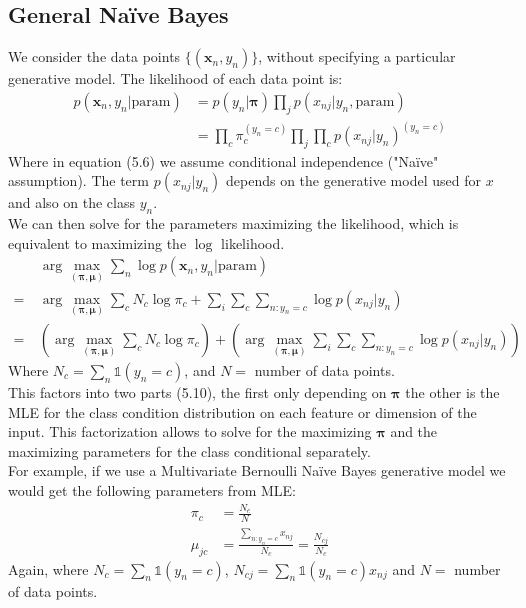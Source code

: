 \documentclass{article}
\renewcommand{\v}{\boldsymbol}
\begin{document}
\subsection{General Na\"ive Bayes}
    We consider the data points $\{(\v x_n,y_n)\}$, without specifying a particular generative model. The likelihood of each data point is:
    \begin{align}
        p(\v x_n,y_n | \text{param}) &= p(y_n|\v \pi)\prod_j p(x_{nj}|y_n, \text{param})\\
        &= \prod_c \pi_c^{(y_n = c)} \prod_j \prod_c p(x_{nj}|y_n)^{(y_n=c)}
    \end{align}
    Where in equation (5.6) we assume conditional independence ("Na\"ive" assumption). The term $p(x_{nj}|y_n)$ depends on the generative model used for $x$ and also on the class $y_n$.\\
    We can then solve for the parameters maximizing the likelihood, which is equivalent to maximizing the $\log$ likelihood.
    \begin{align}
    		&\arg\!\max_{(\v \pi,\v \mu)} \sum_n \log p(\v x_n , y_n| \text{param})\\
    		=~ & \arg\!\max_{(\v \pi,\v \mu)} \sum_c N_c \log \pi_c + \sum_i\sum_c\sum_{n:y_n=c}\log p(x_{nj}|y_n)\\
    	    =~ & \left(\arg\!\max_{(\v \pi,\v \mu)} \sum_c N_c \log \pi_c\right) + \left(\arg\!\max_{(\v \pi,\v \mu)} \sum_i\sum_c\sum_{n:y_n=c}\log p(x_{nj}|y_n)\right)
    \end{align}
    Where $N_c = \sum_n \mathbb{1}(y_n = c)$, and $N =$ number of data points.\\
    This factors into two parts (5.10), the first only depending on $\v\pi$ the other is the MLE for the class condition distribution on each feature or dimension of the input. This factorization allows to solve for the maximizing $\v\pi$ and the maximizing parameters for the class conditional separately.\\
    For example, if we use a Multivariate Bernoulli Na\"ive Bayes generative model we would get the following parameters from MLE:
    \begin{align}
    		\pi_c &= \frac{N_c}{N}\\
    		\mu_{jc} &= \frac{\sum_{n:y_n=c}x_{nj}}{N_c} = \frac{N_{cj}}{N_c}
    \end{align}
    Again, where $N_c = \sum_n \mathbb{1}(y_n = c)$, $N_{cj} = \sum_n \mathbb{1}(y_n = c) x_{nj}$ and $N =$ number of data points.\\
\end{document}
